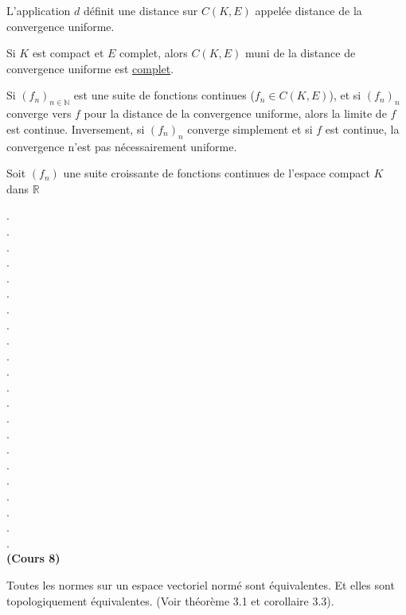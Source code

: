 \documentclass[12pt,a4paper]{article}
\begin{document}
\begin{flushleft}
\begin{thm}
L'application $d$ définit une distance sur $C(K,E)$ appelée distance de la convergence uniforme.
 \end{thm}


\begin{thm}
Si $K$ est compact et $E$ complet, alors $C(K,E)$ muni de la distance de convergence uniforme est \underline{complet}.
 \end{thm}


\begin{rem}
Si $(f_n)_{n \in \mathbb{N}}$ est une suite de fonctions continues ($f_n \in C(K,E)$), et si $(f_n)_n$ converge vers $f$ pour la distance de la convergence uniforme, alors la limite de $f$ est continue. Inversement, si $(f_n)_n$ converge simplement et si $f$ est continue, la convergence n'est pas nécessairement uniforme.
 \end{rem}


\begin{thm}
Soit $(f_n)$ une suite croissante de fonctions continues de l'espace compact $K$ dans $\mathbb{R}$
 \end{thm}



.\\
.\\
.\\
.\\
.\\
.\\
.\\
.\\
.\\
.\\
.\\
.\\
.\\
.\\
.\\
.\\
.\\
.\\
.\\
.\\
.\\
.\\


\textbf{(Cours 8)}
\begin{cor} Toutes les normes sur un espace vectoriel normé sont équivalentes. Et elles sont topologiquement équivalentes. (Voir théorème 3.1 et corollaire 3.3).
\end{cor}


\end{flushleft}
\end{document}

